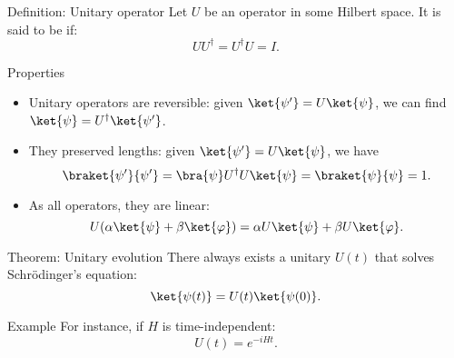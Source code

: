 \documentclass[a4paper]{article}
\begin{document}
\begin{parag}{Definition: Unitary operator}
    Let $U$ be an operator in some Hilbert space. It is said to be  if: 
    \[U U^{\dagger} = U^{\dagger} U = I.\]

    \begin{subparag}{Properties}
        \begin{itemize}[left=0pt]
            \item Unitary operators are reversible: given $\ket{\psi'} = U\ket{\psi}$, we can find $\ket{\psi} = U^{\dagger} \ket{\psi'}$.
            \item They preserved lengths: given $\ket{\psi'} = U \ket{\psi}$, we have
            \[\braket{\psi'}{\psi'} = \bra{\psi} U^{\dagger} U \ket{\psi} = \braket{\psi}{\psi} = 1.\]
            \item As all operators, they are linear:
            \[U \left(\alpha \ket{\psi} + \beta \ket{\phi}\right) = \alpha U \ket{\psi} + \beta U \ket{\phi}.\]
        \end{itemize}
    \end{subparag}
\end{parag}

\begin{parag}{Theorem: Unitary evolution}
    There always exists a unitary $U\left(t\right)$ that solves Schrödinger's equation: 
    \[\ket{\psi\left(t\right)} = U\left(t\right) \ket{\psi\left(0\right)}.\]

    \begin{subparag}{Example}
        For instance, if $H$ is time-independent:
        \[U\left(t\right) = e^{-i H t}.\]
    \end{subparag}
\end{parag}
\end{document}
